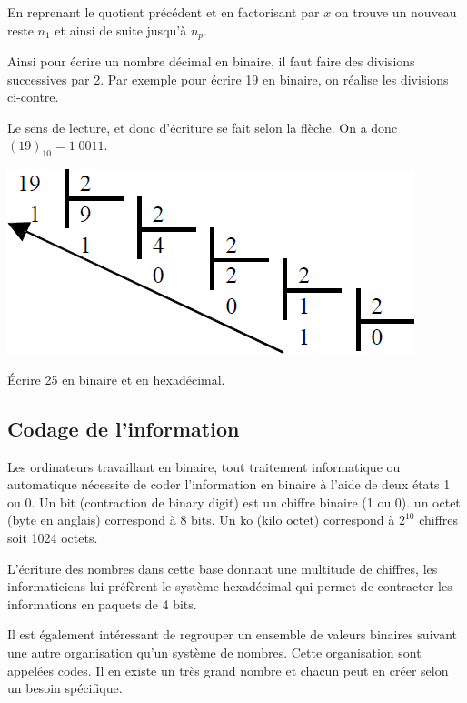 \documentclass[11pt,oneside]{article}
\begin{document}
\begin{minipage}[c]{.45\linewidth}

En reprenant le quotient précédent et en factorisant par $x$ on trouve un nouveau reste $n_1$ et ainsi de suite jusqu'à $n_p$. 

Ainsi pour écrire un nombre décimal en binaire, il faut faire des divisions successives par 2. Par exemple pour écrire 19 en binaire, on réalise les divisions ci-contre. 

Le sens de lecture, et donc d'écriture se fait selon la flèche. On a donc $(19)_{10}=1\;0011$.

\end{minipage} \hfill
\begin{minipage}[c]{.45\linewidth}
\includegraphics[width=.8\textwidth]{png/fig_01}
\end{minipage} 

\begin{exemple}
Écrire 25 en binaire et en hexadécimal. 
\end{exemple}

\subsection{Codage de l'information} 

Les ordinateurs travaillant en binaire, tout traitement informatique ou automatique nécessite de coder l'information en binaire à l'aide de deux états 1 ou 0. Un bit (contraction de binary digit) est un chiffre binaire (1 ou 0). un octet (byte en anglais) correspond à 8 bits. Un ko (kilo octet) correspond à $2^{10}$ chiffres soit 1024 octets.

L'écriture des nombres dans cette base donnant une multitude de chiffres, les informaticiens lui préfèrent le système hexadécimal qui permet de contracter les informations en paquets de 4 bits. 

Il est également intéressant de regrouper un ensemble de valeurs binaires suivant une autre organisation qu'un système de nombres. Cette organisation sont appelées codes. Il en existe un très grand nombre et chacun peut en créer selon un besoin spécifique.
\end{document}
